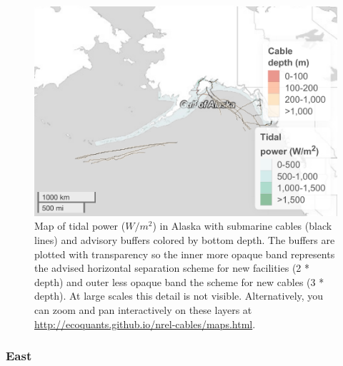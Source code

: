 \documentclass[]{article}
\begin{document}
\begin{figure}
\centering
\includegraphics{report_files/figure-latex/mapTideAlaska-1.pdf}
\caption{\label{fig:mapTideAlaska}Map of tidal power (\(W/m^2\)) in Alaska
with submarine cables (black lines) and advisory buffers colored by
bottom depth. The buffers are plotted with transparency so the inner
more opaque band represents the advised horizontal separation scheme for
new facilities (2 * depth) and outer less opaque band the scheme for new
cables (3 * depth). At large scales this detail is not visible.
Alternatively, you can zoom and pan interactively on these layers at
\url{http://ecoquants.github.io/nrel-cables/maps.html}.}
\end{figure}

\hypertarget{east}{%
\subsubsection{East}\label{east}}
\end{document}
